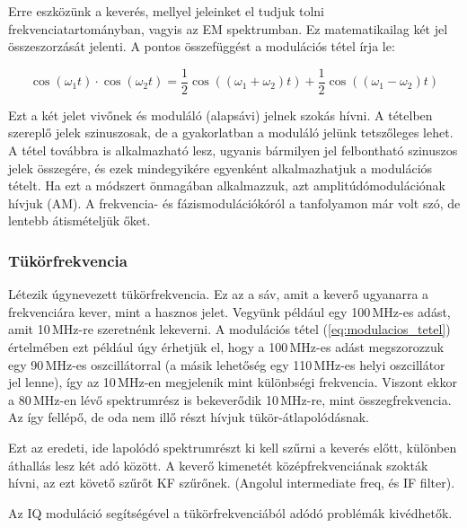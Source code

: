 \documentclass[12pt,a4paper]{article}
\begin{document}
Erre eszközünk a keverés, mellyel jeleinket el tudjuk tolni frekvenciatartományban, vagyis az EM spektrumban. Ez matematikailag két jel összeszorzását jelenti.
A pontos összefüggést a modulációs tétel írja le:

\begin{equation}
    \cos \left( \omega_{1} t \right) \cdot \cos \left( \omega_{2} t \right) = 
    \frac{1}{2} \cos \left( \left( \omega_{1} + \omega_{2} \right) t \right) + \frac{1}{2} \cos \left( \left( \omega_{1} - \omega_{2} \right) t \right)
    \label{eq:modulacios_tetel}
\end{equation}

Ezt a két jelet vivőnek és moduláló (alapsávi) jelnek szokás hívni. A tételben szereplő jelek szinuszosak, de a gyakorlatban a moduláló jelünk tetszőleges lehet. A tétel továbbra is alkalmazható lesz, ugyanis bármilyen jel felbontható szinuszos jelek összegére, és ezek mindegyikére egyenként alkalmazhatjuk a modulációs tételt. Ha ezt a módszert önmagában alkalmazzuk, azt amplitúdómodulációnak hívjuk (AM). A frekvencia- és fázismodulációkóról a tanfolyamon már volt szó, de lentebb átismételjük őket.


\subsubsection{Tükörfrekvencia}


Létezik úgynevezett tükörfrekvencia. Ez az a sáv, amit a keverő ugyanarra a frekvenciára kever, mint a hasznos jelet. Vegyünk például egy 100\,MHz-es adást, amit 10\,MHz-re szeretnénk lekeverni. A modulációs tétel (\ref{eq:modulacios_tetel}) értelmében ezt például úgy érhetjük el, hogy a 100\,MHz-es adást megszorozzuk egy 90\,MHz-es oszcillátorral (a másik lehetőség egy 110\,MHz-es helyi oszcillátor jel lenne), így az 10\,MHz-en megjelenik mint különbségi frekvencia. Viszont ekkor a 80\,MHz-en lévő spektrumrész is bekeverődik 10\,MHz-re, mint összegfrekvencia. Az így fellépő, de oda nem illő részt hívjuk tükör-átlapolódásnak.

Ezt az eredeti, ide lapolódó spektrumrészt ki kell szűrni a keverés előtt, különben áthallás lesz két adó között. A keverő kimenetét középfrekvenciának szokták hívni, az ezt követő szűrőt KF szűrőnek. (Angolul intermediate freq, és IF filter).

Az IQ moduláció segítségével a tükörfrekvenciából adódó problémák kivédhetők.
\end{document}
